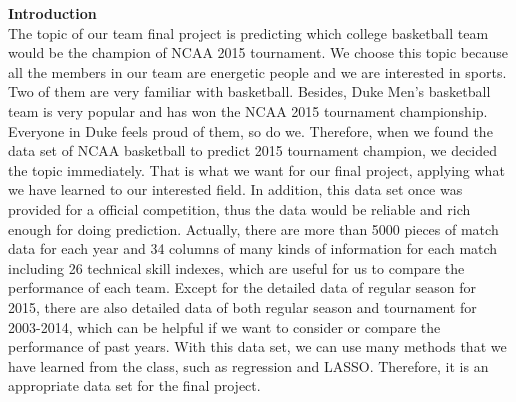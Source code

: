 \documentclass{article}
\begin{document}
\textbf{Introduction}\\
 The topic of our team final project is predicting which college basketball team would be the champion of NCAA 2015 tournament. We choose this topic because all the members in our team are energetic people and we are interested in sports. Two of them are very familiar with basketball. Besides, Duke Men's basketball team is very popular and has won the NCAA 2015 tournament championship. Everyone in Duke feels proud of them, so do we. Therefore, when we found the data set of NCAA basketball to predict 2015 tournament champion, we decided the topic immediately. That is what we want for our final project, applying what we have learned to our interested field. In addition, this data set once was provided for a official competition, thus the data would be reliable and rich enough for doing prediction. Actually, there are more than 5000 pieces of match data for each year and 34 columns of many kinds of information for each match including 26 technical skill indexes, which are useful for us to compare the performance of each team. Except for the detailed data of regular season for 2015, there are also detailed data of both regular season and tournament for 2003-2014, which can be helpful if we want to consider or compare the performance of past years. With this data set, we can use many methods that we have learned from the class, such as regression and LASSO. Therefore, it is an appropriate data set for the final project.
\end{document}
